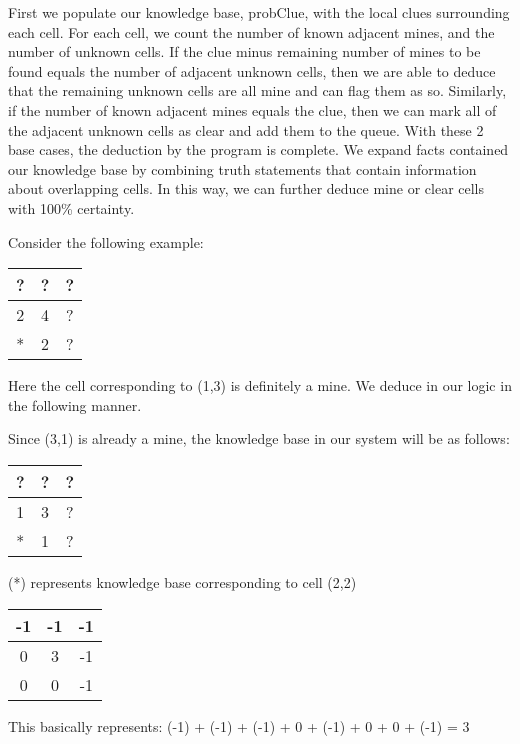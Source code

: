 \documentclass[a4paper]{article}
\begin{document}
First we populate our knowledge base, probClue, with the local clues surrounding each cell. For each cell, we count the number of known adjacent mines, and the number of unknown cells. If the clue minus remaining number of mines to be found equals the number of adjacent unknown cells, then we are able to deduce that the remaining unknown cells are all mine and can flag them as so. Similarly, if the number of known adjacent mines equals the clue, then we can mark all of the adjacent unknown cells as clear and add them to the queue. With these 2 base cases, the deduction by the program is complete. We expand facts contained our knowledge base by combining truth statements that contain information about overlapping cells. In this way, we can further deduce mine or clear cells with 100\% certainty.

Consider the following example:
\begin{center}
\begin{tabular}{|c|c|c|}
\hline
? & ? & ?\\
\hline
2 & 4 & ?\\
\hline
* & 2 & ?\\
\hline
\end{tabular}
\end{center}

Here the cell corresponding to (1,3) is definitely a mine. We deduce in our logic in the following manner.

Since (3,1) is already a mine, the knowledge base in our system will be as follows:
\begin{center}
\begin{tabular}{|c|c|c|}
\hline
? & ? & ?\\
\hline
1 & 3 & ?\\
\hline
* & 1 & ?\\
\hline
\end{tabular}
\end{center}

(*) represents knowledge base corresponding to cell (2,2)
\begin{center}
\begin{tabular}{|c|c|c|}
\hline
-1 & -1 & -1\\
\hline
 0 &  3 & -1\\
\hline
 0 &  0 & -1\\
\hline
\end{tabular}
\end{center}

This basically represents:
(-1) + (-1) + (-1) + 0 + (-1) + 0 + 0 + (-1) = 3
\end{document}
